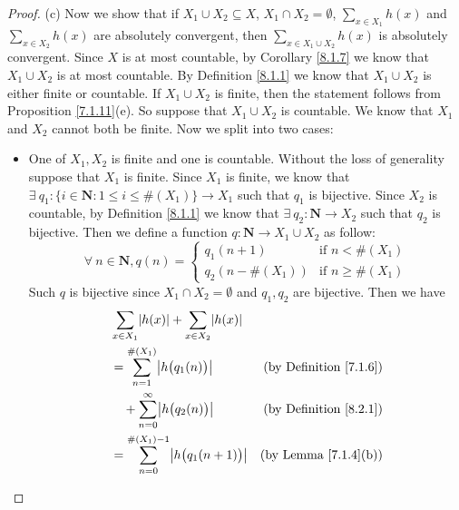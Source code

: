 \begin{proof}{(c)}
    Now we show that if \(X_1 \cup X_2 \subseteq X\), \(X_1 \cap X_2 = \emptyset\), \(\sum_{x \in X_1} h(x)\) and \(\sum_{x \in X_2} h(x)\) are absolutely convergent, then \(\sum_{x \in X_1 \cup X_2} h(x)\) is absolutely convergent.
    Since \(X\) is at most countable, by Corollary \ref{8.1.7} we know that \(X_1 \cup X_2\) is at most countable.
    By Definition \ref{8.1.1} we know that \(X_1 \cup X_2\) is either finite or countable.
    If \(X_1 \cup X_2\) is finite, then the statement follows from Proposition \ref{7.1.11}(e).
    So suppose that \(X_1 \cup X_2\) is countable.
    We know that \(X_1\) and \(X_2\) cannot both be finite.
    Now we split into two cases:
    \begin{itemize}
        \item One of \(X_1, X_2\) is finite and one is countable.
              Without the loss of generality suppose that \(X_1\) is finite.
              Since \(X_1\) is finite, we know that \(\exists\ q_1 : \{i \in \mathbf{N} : 1 \leq i \leq \#(X_1)\} \to X_1\) such that \(q_1\) is bijective.
              Since \(X_2\) is countable, by Definition \ref{8.1.1} we know that \(\exists\ q_2 : \mathbf{N} \to X_2\) such that \(q_2\) is bijective.
              Then we define a function \(q : \mathbf{N} \to X_1 \cup X_2\) as follow:
              \[
                  \forall\ n \in \mathbf{N}, q(n) = \begin{cases}
                      q_1(n + 1)       & \text{if } n < \#(X_1)    \\
                      q_2(n - \#(X_1)) & \text{if } n \geq \#(X_1)
                  \end{cases}
              \]
              Such \(q\) is bijective since \(X_1 \cap X_2 = \emptyset\) and \(q_1, q_2\) are bijective.
              Then we have
              \begin{align*}
                   & \sum_{x \in X_1} \abs*{h(x)} + \sum_{x \in X_2} \abs*{h(x)}                                                                                      \\
                   & = \sum_{n = 1}^{\#(X_1)} \abs*{h\big(q_1(n)\big)}                                                      & \text{(by Definition \ref{7.1.6})}      \\
                   & \quad + \sum_{n = 0}^\infty \abs*{h\big(q_2(n)\big)}                                                   & \text{(by Definition \ref{8.2.1})}      \\
                   & = \sum_{n = 0}^{\#(X_1) - 1} \abs*{h\big(q_1(n + 1)\big)}                                              & \text{(by Lemma \ref{7.1.4}(b))}        \\

\end{align*}
\end{itemize}
\end{proof}

